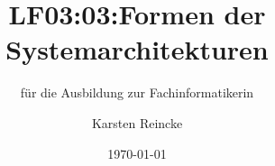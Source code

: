 \documentclass[]{beamer}
\title{LF03:03:Formen der Systemarchitekturen}
\subtitle{für die Ausbildung zur Fachinformatikerin}
\institute{GS-LDK}
\author{Karsten Reincke}
\date{\today}
\def\cfgGl{../../../cfg.gl/}
\begin{document}

\begin{frame}
  \titlepage
\end{frame}






\logo{}
\newpage



%
\end{document}
